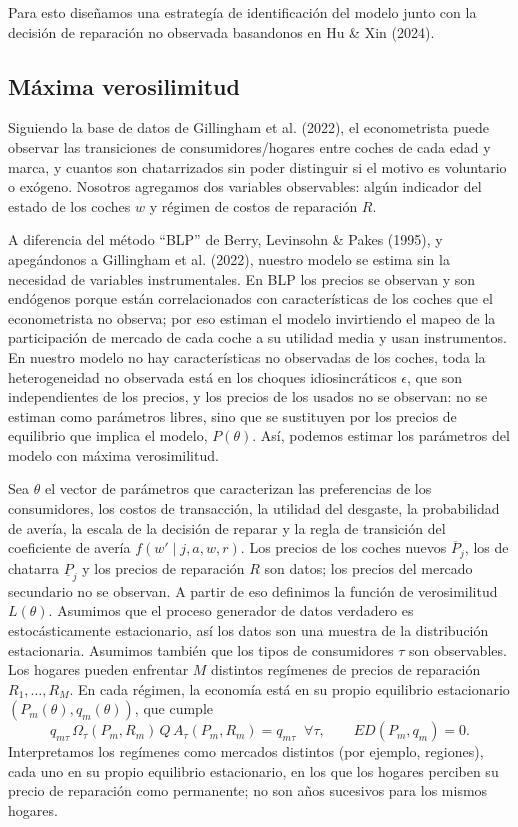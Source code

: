 \documentclass{article}
\begin{document}
Para esto diseñamos una estrategía de identificación del modelo junto con la decisión de reparación no observada basandonos en Hu \& Xin (2024).

\subsection{Máxima verosilimitud}

Siguiendo la base de datos de Gillingham et al. (2022), el econometrista puede observar las transiciones de consumidores/hogares entre coches de cada edad y marca, y cuantos son chatarrizados sin poder distinguir si el motivo es voluntario o exógeno. Nosotros agregamos dos variables observables: algún indicador del estado de los coches $w$ y régimen de costos de reparación $R$.

A diferencia del método ``BLP'' de Berry, Levinsohn \& Pakes (1995), y apegándonos a Gillingham et al. (2022), nuestro modelo se estima sin la necesidad de variables instrumentales. En BLP los precios se observan y son endógenos porque están correlacionados con características de los coches que el econometrista no observa; por eso estiman el modelo invirtiendo el mapeo de la participación de mercado de cada coche a su utilidad media y usan instrumentos. En nuestro modelo no hay características no observadas de los coches, toda la heterogeneidad no observada está en los choques idiosincráticos $\epsilon$, que son independientes de los precios, y los precios de los usados no se observan: no se estiman como parámetros libres, sino que se sustituyen por los precios de equilibrio que implica el modelo, $P(\theta)$. Así, podemos estimar los parámetros del modelo con máxima verosimilitud.

Sea $\theta$ el vector de parámetros que caracterizan las preferencias de los consumidores, los costos de transacción, la utilidad del desgaste, la probabilidad de avería, la escala de la decisión de reparar y la regla de transición del coeficiente de avería $f(w'\mid j,a,w,r)$. Los precios de los coches nuevos $\overline{P}_j$, los de chatarra $\underline{P}_j$ y los precios de reparación $R$ son datos; los precios del mercado secundario no se observan. A partir de eso definimos la función de verosimilitud $L(\theta)$. Asumimos que el proceso generador de datos verdadero es estocásticamente estacionario, así los datos son una muestra de la distribución estacionaria. Asumimos también que los tipos de consumidores $\tau$ son observables. Los hogares pueden enfrentar $M$ distintos regímenes de precios de reparación $R_1,\dots,R_M$. En cada régimen, la economía está en su propio equilibrio estacionario $(P_m(\theta), q_m(\theta))$, que cumple
$$q_{m\tau}\,\Omega_\tau(P_m,R_m)\,Q\,A_\tau(P_m,R_m)=q_{m\tau}\;\;\forall\tau,\qquad ED(P_m,q_m)=0 .$$
Interpretamos los regímenes como mercados distintos (por ejemplo, regiones), cada uno en su propio equilibrio estacionario, en los que los hogares perciben su precio de reparación como permanente; no son años sucesivos para los mismos hogares.
\end{document}
